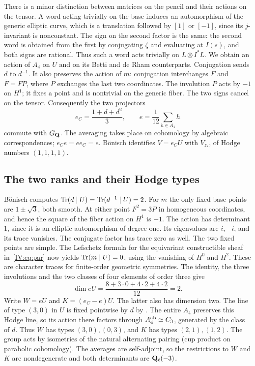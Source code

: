 \documentclass[11pt,letterpaper]{article}
\theoremstyle{definition}
\theoremstyle{remark}
\begin{document}
There is a minor distinction between matrices on the pencil and their
actions on the tensor. A word acting trivially on the base induces an
automorphism of the generic elliptic curve, which is a translation
followed by $[1]$ or $[-1]$, since its $j$-invariant is nonconstant.
The sign on the second factor is the same: the second word is obtained
from the first by conjugating $\zeta$ and evaluating at $I(s)$, and
both signs are rational. Thus such a word acts trivially on
$L\otimes I^*L$. We obtain an action of $A_4$ on $U$ and on its
Betti and de Rham counterparts. Conjugation sends $d$ to $d^{-1}$.
It also preserves the action of $m$: conjugation interchanges $F$ and
$\bar F=FP$, where $P$ exchanges the last two coordinates. The
involution $P$ acts by $-1$ on $H^1$; it fixes a point and is
nontrivial on the generic fiber. The two signs cancel on the tensor.
Consequently the two projectors
\begin{equation}\label{IV:eq:avg}
 e_C=\frac{1+d+d^2}{3},\qquad
 e=\frac1{12}\sum_{h\in A_4}h
\end{equation}
commute with $G_\mathbf Q$. The averaging takes place on cohomology by
algebraic correspondences; $e_Ce=ee_C=e$. B\"onisch identifies
$V=e_CU$ with $V_{z_*}$, of Hodge numbers $(1,1,1,1)$.

\subsection{The two ranks and their Hodge types}
B\"onisch computes $\operatorname{Tr}(d\mid U)=\operatorname{Tr}(d^{-1}\mid U)=2$.
For $m$ the only fixed base points are $1\pm\sqrt3$, both smooth.
At either point $F^2=3P$ in homogeneous coordinates, and hence the
square of the fiber action on $H^1$ is $-1$. The action has determinant
$1$, since it is an elliptic automorphism of degree one. Its eigenvalues
are $i,-i$, and its trace vanishes. The conjugate factor has trace
zero as well. The two fixed points are simple. The Lefschetz formula
for the equivariant constructible sheaf in~\eqref{IV:eq:par} now yields
$\operatorname{Tr}(m\mid U)=0$, using the vanishing of $H^0$ and $H^2$.
These are character traces for finite-order geometric symmetries.
The identity, the three involutions and the two classes of four
elements of order three give
\[
 \dim eU=\frac{8+3\cdot0+4\cdot2+4\cdot2}{12}=2.
\]
Write $W=eU$ and $K=(e_C-e)U$. The latter also has dimension two.
The line of type $(3,0)$ in $U$ is fixed pointwise by $d$ by
\cite[\S5.1]{IV:bonisch}. The entire $A_4$ preserves this Hodge line, so
its action there factors through $A_4^{\rm ab}\simeq C_3$, generated
by the class of $d$. Thus $W$ has types $(3,0),(0,3)$, and $K$ has
types $(2,1),(1,2)$. The group acts by isometries of the natural
alternating pairing (cup product on parabolic cohomology). The
averages are self-adjoint, so the restrictions to $W$ and $K$ are
nondegenerate and both determinants are $\mathbf Q_\ell(-3)$.
\end{document}
